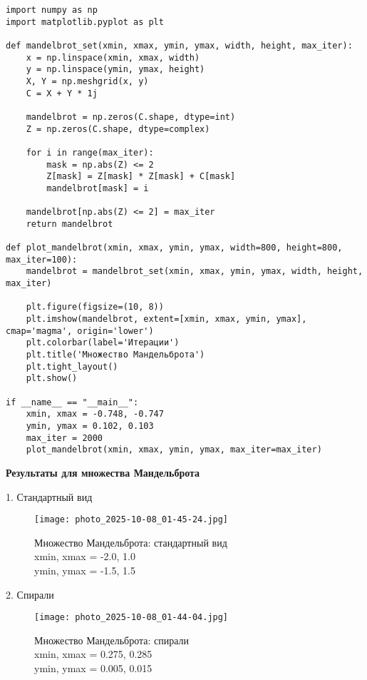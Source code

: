 \documentclass[a4paper,12pt]{article}
\begin{document}
\begin{verbatim}
import numpy as np
import matplotlib.pyplot as plt

def mandelbrot_set(xmin, xmax, ymin, ymax, width, height, max_iter):
    x = np.linspace(xmin, xmax, width)
    y = np.linspace(ymin, ymax, height)
    X, Y = np.meshgrid(x, y)
    C = X + Y * 1j

    mandelbrot = np.zeros(C.shape, dtype=int)
    Z = np.zeros(C.shape, dtype=complex)

    for i in range(max_iter):
        mask = np.abs(Z) <= 2
        Z[mask] = Z[mask] * Z[mask] + C[mask]
        mandelbrot[mask] = i

    mandelbrot[np.abs(Z) <= 2] = max_iter
    return mandelbrot

def plot_mandelbrot(xmin, xmax, ymin, ymax, width=800, height=800, max_iter=100):
    mandelbrot = mandelbrot_set(xmin, xmax, ymin, ymax, width, height, max_iter)

    plt.figure(figsize=(10, 8))
    plt.imshow(mandelbrot, extent=[xmin, xmax, ymin, ymax], cmap='magma', origin='lower')
    plt.colorbar(label='Итерации')
    plt.title('Множество Мандельброта')
    plt.tight_layout()
    plt.show()

if __name__ == "__main__":
    xmin, xmax = -0.748, -0.747
    ymin, ymax = 0.102, 0.103
    max_iter = 2000
    plot_mandelbrot(xmin, xmax, ymin, ymax, max_iter=max_iter)
\end{verbatim}

\newpage

\begin{center}
    \textbf{Результаты для множества Мандельброта}
\end{center}

1. Стандартный вид

\begin{figure}[h!]
    \centering
    \texttt{[image: photo\_2025-10-08\_01-45-24.jpg]}
    \caption{Множество Мандельброта: стандартный вид \\ xmin, xmax = -2.0, 1.0 \\ ymin, ymax = -1.5, 1.5}
    \label{fig:mandel1}
\end{figure}

\newpage

2. Спирали

\begin{figure}[h!]
    \centering
    \texttt{[image: photo\_2025-10-08\_01-44-04.jpg]}
    \caption{Множество Мандельброта: спирали \\ xmin, xmax = 0.275, 0.285 \\ ymin, ymax = 0.005, 0.015}
    \label{fig:mandel2}
\end{figure}
\end{document}
